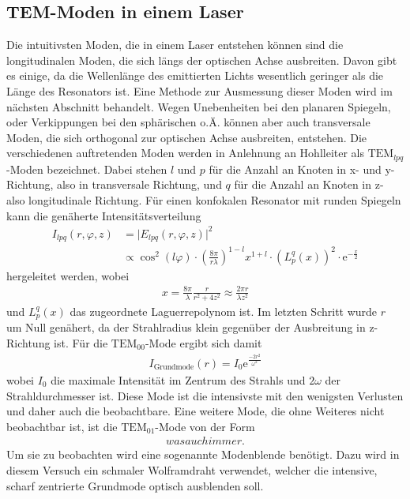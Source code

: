 \subsection{TEM-Moden in einem Laser}

Die intuitivsten Moden, die in einem Laser entstehen können sind die longitudinalen
Moden, die sich längs der optischen Achse ausbreiten. Davon gibt es einige, da die
Wellenlänge des emittierten Lichts wesentlich geringer als die Länge des Resonators ist.
Eine Methode zur Ausmessung dieser Moden wird im nächsten Abschnitt behandelt.
Wegen Unebenheiten bei den planaren Spiegeln, oder Verkippungen bei den sphärischen o.Ä.
können aber auch transversale Moden, die sich orthogonal zur optischen Achse ausbreiten, entstehen.
Die verschiedenen auftretenden Moden werden in Anlehnung an Hohlleiter als $\text{TEM}_{lpq}$-Moden
bezeichnet. Dabei stehen $l$ und $p$ für die Anzahl an Knoten in x- und y-Richtung, also
in transversale Richtung, und $q$ für die Anzahl an Knoten in z- also longitudinale
Richtung. Für einen konfokalen Resonator mit runden Spiegeln kann die genäherte Intensitätsverteilung
\begin{align}
  I_{lpq}(r,\varphi,z) &= \lvert E_{lpq}(r,\varphi,z) \rvert^2 \\
  &\propto \cos^2\left(l \varphi\right) \cdot \left(\frac{8 \pi}{r \lambda}\right)^{1-l} x^{1+l} \cdot \left(L^q_p (x)\right)^2 \cdot \mathrm{e}^{-\frac{x}{2}}
\end{align}
hergeleitet werden, wobei
\begin{align}
  x = \frac{8 \pi}{\lambda} \frac{r}{r^2 + 4 z^2} \approx \frac{2 \pi r}{\lambda z^2}
\end{align}
und $L^q_p(x)$ das zugeordnete Laguerrepolynom ist. Im letzten Schritt wurde $r$ um Null genähert, da der Strahlradius klein
gegenüber der Ausbreitung in z-Richtung ist. Für die $\text{TEM}_{00}$-Mode ergibt sich damit
\begin{align}
  I_{\text{Grundmode}}(r) = I_0 \mathrm{e}^{\frac{-2 r^2}{\omega^2}}
\end{align}
wobei $I_0$ die maximale Intensität im Zentrum des Strahls und $2 \omega$ der Strahldurchmesser ist.
Diese Mode ist die intensivste mit den wenigsten Verlusten und daher auch die beobachtbare.
Eine weitere Mode, die ohne Weiteres nicht beobachtbar ist, ist die $\text{TEM}_{01}$-Mode
von der Form
\begin{align}
  was auch immer.
\end{align}
Um sie zu beobachten wird eine sogenannte Modenblende benötigt. Dazu wird in diesem Versuch ein
schmaler Wolframdraht verwendet, welcher die intensive, scharf zentrierte Grundmode optisch ausblenden soll.

